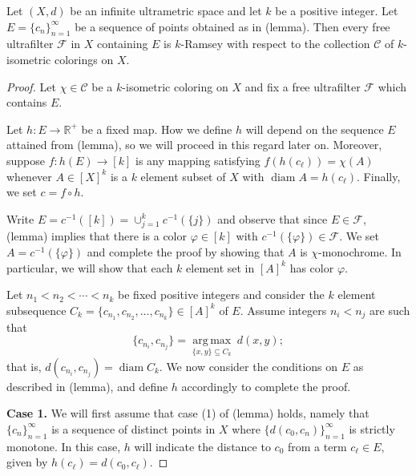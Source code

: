 \begin{theorem}
Let \( (X,d) \) be an infinite ultrametric space and let \( k \) be a positive integer. Let \(E = \{ c_{n}  \}_{n = 1} ^{\infty}  \) be a sequence of points obtained as in (lemma). Then every free ultrafilter \( \mathcal{F}  \) in \( X \) containing \( E \) is \( k \)-Ramsey with respect to the collection \( \mathcal{C}  \) of \( k \)-isometric colorings on \( X \).
\end{theorem}
\begin{proof}
Let \( \chi \in \mathcal{C}  \) be a \( k \)-isometric coloring on \( X \) and fix a free ultrafilter \( \mathcal{F}  \) which contains \( E \).

Let \( h  : E \to \mathbb{R^{+}} \) be a fixed map. How we define \( h \) will depend on the sequence \( E \) attained from (lemma), so we will proceed in this regard later on. Moreover, suppose \( f : h (E) \to [k] \) is any mapping satisfying \( f(h(c_{\ell} )) = \chi (A) \) whenever \( A \in [X]^{k}  \) is a \( k \) element subset of \( X \) with \( \operatorname{diam}A = h(c_{\ell} ) \). Finally, we set \( c = f \circ h  \).

Write \( E = c ^{-1} ([k]) = \cup_{j=1}^{k} c^{-1} (\{ j \} )  \) and observe that since \( E \in \mathcal{F}  \), (lemma) implies that there is a color \( \varphi \in [k] \) with \( c ^{-1} (\{ \varphi  \} ) \in \mathcal{F}   \). We set \( A = c ^{-1} (\{ \varphi  \} )  \) and complete the proof by showing that \( A \) is \( \chi \)-monochrome. In particular, we will show that each \( k \) element set in \( [A]^{k}  \) has color \( \varphi \).




Let \( n_1 < n_2 < \cdots < n_{k}  \) be fixed positive integers and consider the \( k \) element subsequence \(C_{k} = \{ c_{n_1} , c_{n_2} , \hdots , c_{n_{k} }   \} \in [A]^{k} \) of \( E \). Assume integers \( n_{i} < n_{j}  \) are such that \[ \{ c_{n_{i} } , c_{n_{j} }  \} = \underset{\{ x, y \} \subseteq C_{k}  }{\operatorname{arg\,max}} \ d(x,y); \] that is, \( d(c_{n_{i} } , c_{n_{j} }) = \operatorname{diam}C_{k}  \). We now consider the conditions on \( E \) as described in (lemma), and define \( h \) accordingly to complete the proof.

\textbf{Case 1.} We will first assume that case (1) of (lemma) holds, namely that \( \{ c_{n}  \} _{n=1} ^{\infty}  \) is a sequence of distinct points in \( X \) where \( \{ d(c_0, c_{n} )  \}_{n = 1} ^{\infty} \) is strictly monotone. In this case, \( h \) will indicate the distance to \( c_0 \) from a term \( c_{\ell} \in E \), given by \( h (c_{\ell} ) = d(c_0, c_{\ell} ) \).


\end{proof}
